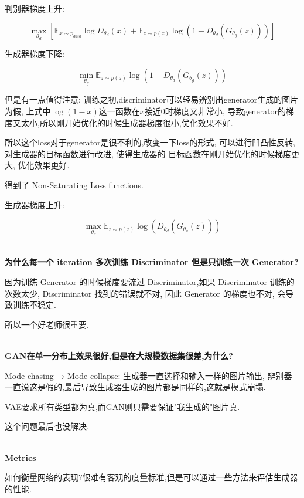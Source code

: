 	判别器梯度上升:
	
	\begin{equation}
	\max_{\theta_d}\left[\mathbb{E}_{x\sim p_{data}}\log D_{\theta_d}(x)+\mathbb{E}_{z\sim p(z)}\log(1-D_{\theta_d}(G_{\theta_g}(z)))\right]
	\end{equation}

	生成器梯度下降:

	\begin{equation}
	\min_{\theta_g}\mathbb{E}_{z\sim p(z)}\log(1-D_{\theta_d}(G_{\theta_g}(z)))	
	\end{equation}
	
	但是有一点值得注意:
	训练之初,discriminator可以轻易辨别出generator生成的图片为假,
	上式中$\log(1-x)$这一函数在$x$接近$0$时梯度又非常小,
	导致generator的梯度又太小,所以刚开始优化的时候生成器梯度很小,优化效果不好.
	
	所以这个loss对于generator是很不利的,改变一下loss的形式,
	可以进行凹凸性反转, 对生成器的目标函数进行改进, 使得生成器的
	目标函数在刚开始优化的时候梯度更大, 优化效果更好.

	得到了 Non-Saturating Loss functions.

	生成器梯度上升:

	\begin{equation}
	\max_{\theta_g}\mathbb{E}_{z\sim p(z)}\log(D_{\theta_d}(G_{\theta_g}(z)))
	\end{equation}

	\textbf{\\为什么每一个 iteration 多次训练 Discriminator 但是只训练一次 Generator?}

	因为训练 Generator 的时候梯度要流过 Discriminator,如果 Discriminator 训练的次数太少,
	Discriminator 找到的错误就不对, 因此 Generator 的梯度也不对, 会导致训练不稳定.

	所以一个好老师很重要.

	\textbf{\\GAN在单一分布上效果很好,但是在大规模数据集很差,为什么?}

	Mode chasing → Mode collapse: 生成器一直选择和输入一样的图片输出,
	辨别器一直说这是假的,最后导致生成器生成的图片都是同样的,这就是模式崩塌.

	VAE要求所有类型都为真,而GAN则只需要保证"我生成的"图片真.
	
	这个问题最后也没解决.

	\textbf{\\Metrics}

	如何衡量网络的表现?很难有客观的度量标准,但是可以通过一些方法来评估生成器的性能.
	
